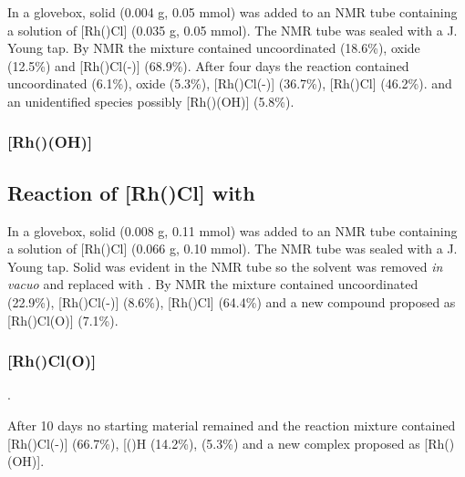 
In a glovebox, solid  (0.004 g, 0.05 mmol) was added to an NMR tube containing a  solution of [Rh(\tBusixantphos)Cl] (0.035 g, 0.05 mmol).  The NMR tube was sealed with a J. Young tap.  By \phosphorus{} NMR the mixture contained uncoordinated \tBusixantphos{} (18.6\%), \tBusixantphos{} oxide (12.5\%) and [Rh(\tBusixantphos)Cl(-)] (68.9\%).  After four days the reaction contained uncoordinated \tBusixantphos{} (6.1\%), \tBusixantphos{} oxide (5.3\%), [Rh(\tBusixantphos)Cl(-)] (36.7\%),  [Rh(\tBusixantphos)Cl] (46.2\%). and an unidentified species possibly [Rh(\tBusixantphos)(OH)] (5.8\%).

\subsubsection{[Rh(\tBusixantphos)(OH)]}


\subsection*{Reaction of [Rh(\tButhixantphos)Cl] with \texorpdfstring{} O}

In a glovebox, solid  (0.008 g, 0.11 mmol) was added to an NMR tube containing a  solution of [Rh(\tButhixantphos)Cl] (0.066 g, 0.10 mmol).  The NMR tube was sealed with a J. Young tap.  Solid was evident in the NMR tube so the solvent was removed \emph{in vacuo} and replaced with .  By \phosphorus{} NMR the mixture contained uncoordinated \tButhixantphos{} (22.9\%), [Rh(\tButhixantphosk)Cl(-)] (8.6\%), [Rh(\tButhixantphosk)Cl] (64.4\%) and a new compound proposed as [Rh(\tButhixantphosk)Cl(O)] (7.1\%).

\subsubsection{[Rh(\tButhixantphosk)Cl(O)]}

.

After 10 days no starting material remained and the reaction mixture contained [Rh(\tButhixantphosk)Cl(-)] (66.7\%), [(\tButhixantphos)H\ce{]+} (14.2\%), \tButhixantphos{} (5.3\%) and a new complex proposed as [Rh(\tButhixantphos)(OH)].

